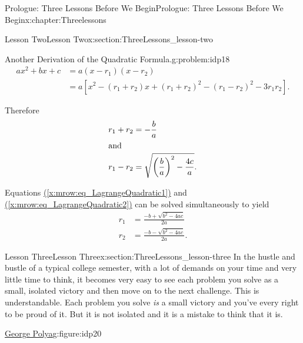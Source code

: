 \documentclass[oneside,10pt,]{book}
\newcommand{\xreffont}{\relax}
\numberwithin{equation}{section}
\newcommand{\amp}{&}
\begin{document}
\begin{chapterptx}{Prologue: Three Lessons Before We Begin}{}{Prologue: Three Lessons Before We Begin}{}{}{x:chapter:Threelessons}
\begin{sectionptx}{Lesson Two}{}{Lesson Two}{}{}{x:section:ThreeLessons_lesson-two}
\begin{problem}{Another Derivation of the Quadratic Formula.}{g:problem:idp18}
\begin{align*}
ax^2+bx+c \amp = a(x-r_1)(x-r_2)\\
\amp = a\left[x^2-(r_1+r_2)x+(r_1+r_2)^2-(r_1-r_2)^2-3r_1r_2\right]\text{.}
\end{align*}
%
\par
Therefore%
\begin{align}
r_1+r_2\amp = -\frac{b}{a}\label{x:mrow:eq_LagrangeQuadratic1}\\
\intertext{and}
r_1-r_2 \amp = \sqrt{\left(\frac{b}{a}\right)^2-\frac{4c}{a}}\text{.}\label{x:mrow:eq_LagrangeQuadratic2}
\end{align}
%
\par
Equations \hyperref[x:mrow:eq_LagrangeQuadratic1]{({\xreffont\ref{x:mrow:eq_LagrangeQuadratic1}})} and \hyperref[x:mrow:eq_LagrangeQuadratic2]{({\xreffont\ref{x:mrow:eq_LagrangeQuadratic2}})} can be solved simultaneously to yield%
\begin{align*}
r_1\amp =\frac{-b+\sqrt{b^2-4ac}}{2a}\\
r_2\amp =\frac{-b-\sqrt{b^2-4ac}}{2a}\text{.}
\end{align*}
%
\end{problem}
\end{sectionptx}
%
%
\typeout{************************************************}
\typeout{************************************************}
%
\begin{sectionptx}{Lesson Three}{}{Lesson Three}{}{}{x:section:ThreeLessons_lesson-three}
In the hustle and bustle of a typical college semester, with a lot of demands on your time and very little time to think, it becomes very easy to see each problem you solve as a small, isolated victory and then move on to the next challenge. This is understandable. Each problem you solve \emph{is} a small victory and you've every right to be proud of it. But it is not isolated and it is a mistake to think that it is.%
\begin{figureptx}{\href{https://mathshistory.st-andrews.ac.uk/Biographies/Polya/}{George Polya}\protect\footnotemark{}}{g:figure:idp20}{}%
\begin{image}{0.36}{0.28}{0.36}%

\end{image}
\end{figureptx}
\end{sectionptx}
\end{chapterptx}
\end{document}
